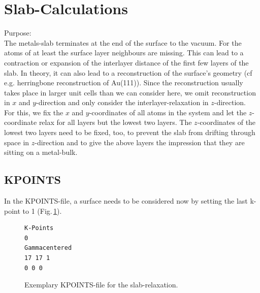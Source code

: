 \documentclass[11pt,oneside,a4paper, captions=nooneline, headsepline]{article}%
\begin{document}
\section{Slab-Calculations}
\label{slab}
Purpose:\\
The metals-slab terminates at the end of the surface to the vacuum. For the atoms of at least the surface layer neighbours are missing. This can lead to a contraction or expansion of the interlayer distance of the first few layers of the slab. In theory, it can also lead to a reconstruction of the surface's geometry (cf e.g. herringbone reconstruction of Au(111)). Since the reconstruction usually takes place in larger unit cells than we can consider here, we omit reconstruction in $x$ and $y$-direction and only consider the interlayer-relaxation in $z$-direction.\\
For this, we fix the $x$ and $y$-coordinates of all atoms in the system and let the $z$-coordinate relax for all layers but the lowest two layers. The $z$-coordinates of the lowest two layers need to be fixed, too, to prevent the slab from drifting through space in $z$-direction and to give the above layers the impression that they are sitting on a metal-bulk.
\subsection{KPOINTS}
In the KPOINTS-file, a surface needs to be considered now by setting the last k-point to 1 (Fig.\,\ref{slabkp}).
\begin{figure}[h!!]
\begin{verbatim}
K-Points
0
Gammacentered
17 17 1
0 0 0
\end{verbatim}
\caption{Exemplary KPOINTS-file for the slab-relaxation.}
\label{slabkp}
\end{figure}
\end{document}
